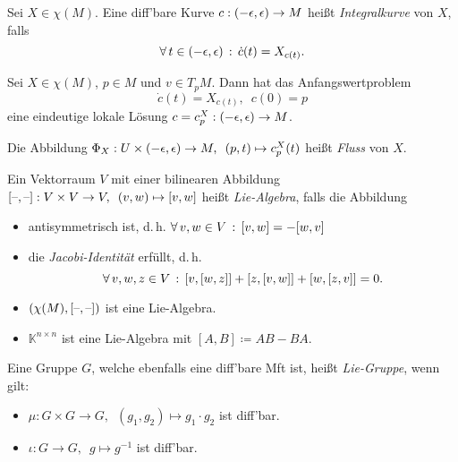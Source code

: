 \documentclass{cheat-sheet}
\newcommand{\K}{\mathbb{K}} %
\begin{document}

\begin{defn}
  Sei $X \in \chi(M)$. Eine diff'bare Kurve $c : \left( -\epsilon, \epsilon \right) \to M$ heißt \emph{Integralkurve} von $X$, falls
  \[ \forall \, {t \in \left( -\epsilon, \epsilon \right)} \,:\, \dot{c}(t) = X_{c(t)}. \]
\end{defn}

\begin{lem}
  Sei $X \in \chi(M)$, $p \in M$ und $v \in T_p M$. Dann hat das Anfangswertproblem
  \[ \dot{c}(t) = X_{c(t)}, \enspace c(0) = p \]
  eine eindeutige lokale Lösung $c = c_p^X : \left( -\epsilon, \epsilon \right) \to M$.
\end{lem}

\begin{defn}
  Die Abbildung $\Phi_X : U \times \left( -\epsilon, \epsilon \right) \to M, \enspace (p, t) \mapsto c_p^X(t)$ heißt \emph{Fluss} von $X$.
\end{defn}


\begin{defn}
  Ein Vektorraum $V$ mit einer bilinearen Abbildung $[\text{--},\text{--}] : V \times V \to V, \enspace (v, w) \mapsto [v,w]$ heißt \emph{Lie-Algebra}, falls die Abbildung
  \begin{itemize}
    \item antisymmetrisch ist, d.\,h. $\forall \, {v, w \in V} \,:\, [v, w] = - [w, v]$
    \item die \emph{Jacobi-Identität} erfüllt, d.\,h.
    \[ \forall \, {v,w,z \in V} \,:\, [v, [w, z]] + [z, [v, w]] + [w, [z, v]] = 0. \]
  \end{itemize}
\end{defn}

\begin{bspe}
  \begin{itemize}
    \item $(\chi(M), [\text{--},\text{--}])$ ist eine Lie-Algebra.
    \item $\K^{n \times n}$ ist eine Lie-Algebra mit $[A, B] \coloneqq AB - BA$.
  \end{itemize}
\end{bspe}

\begin{defn}
  Eine Gruppe $G$, welche ebenfalls eine diff'bare Mft ist, heißt \emph{Lie-Gruppe}, wenn gilt:
  \begin{itemize}
    \item $\mu : G \times G \to G, \enspace (g_1, g_2) \mapsto g_1 \cdot g_2$ ist diff'bar.
    \item $\iota : G \to G, \enspace g \mapsto g^{-1}$ ist diff'bar.
  \end{itemize}
\end{defn}
\end{document}
